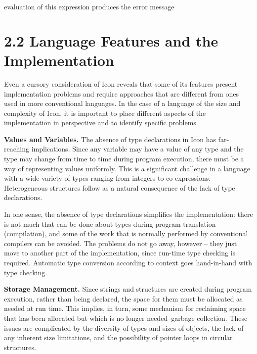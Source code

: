 \noindent
evaluation of this expression produces the error message




\section[2.2 Language Features and the Implementation]{2.2 Language Features and the Implementation}

Even a cursory consideration of Icon reveals that some of its features
present implementation problems and require approaches that are
different from ones used in more conventional languages. In the case
of a language of the size and complexity of Icon, it is important to
place different aspects of the implementation in perspective and to
identify specific problems.


\textbf{Values and Variables.} The absence of type declarations in
Icon has far-reaching implications. Since any variable may have a
value of any type and the type may change from time to time during
program execution, there must be a way of representing values
uniformly. This is a significant challenge in a language with a wide
variety of types ranging from integers to
co-expressions. Heterogeneous structures follow as a natural
consequence of the lack of type declarations.

In one sense, the absence of type declarations simplifies the
implementation: there is not much that can be done about types during
program translation (compilation), and some of the work that is
normally performed by conventional compilers can be avoided. The
problems do not go away, however -- they just move to another part of
the implementation, since run-time type checking is
required. Automatic type conversion according to context goes
hand-in-hand with type checking.


\textbf{Storage Management.} Since strings and structures are created
during program execution, rather than being declared, the space for
them must be allocated as needed at run time. This implies, in turn,
some mechanism for reclaiming space that has been allocated but which
is no longer needed--{\textquotedbl}garbage collection.{\textquotedbl}
These issues are complicated by the diversity of types and sizes of
objects, the lack of any inherent size limitations, and the
possibility of pointer loops in circular structures.


